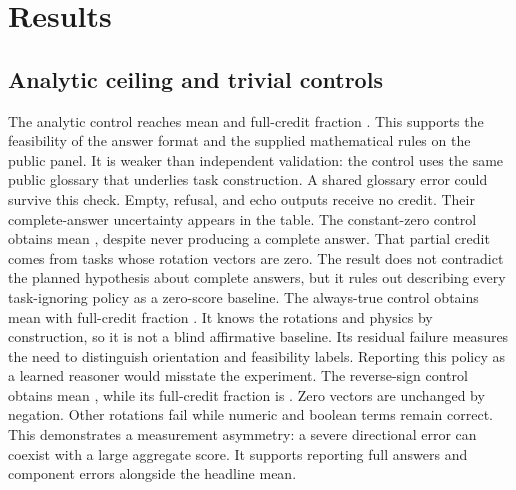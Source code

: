 \documentclass{article}
\begin{document}
\section{Results}
\subsection{Analytic ceiling and trivial controls}
\begin{table}[ht]\centering\small\caption{Scripted controls. Brackets are 95\% intervals. Means resample tricks; full-credit intervals use Wilson's task-level model.}\end{table}

The analytic control reaches mean \OracleMean{} and full-credit fraction \OracleFull{}. This supports the feasibility of the answer format and the supplied mathematical rules on the public panel. It is weaker than independent validation: the control uses the same public glossary that underlies task construction. A shared glossary error could survive this check.
Empty, refusal, and echo outputs receive no credit. Their complete-answer uncertainty appears in the table. The constant-zero control obtains mean \ConstantMean{}, despite never producing a complete answer. That partial credit comes from tasks whose rotation vectors are zero. The result does not contradict the planned hypothesis about complete answers, but it rules out describing every task-ignoring policy as a zero-score baseline.
The always-true control obtains mean \AlwaysMean{} with full-credit fraction \AlwaysFull{}. It knows the rotations and physics by construction, so it is not a blind affirmative baseline. Its residual failure measures the need to distinguish orientation and feasibility labels. Reporting this policy as a learned reasoner would misstate the experiment.
The reverse-sign control obtains mean \ReverseMean{}, while its full-credit fraction is \ReverseFull{}. Zero vectors are unchanged by negation. Other rotations fail while numeric and boolean terms remain correct. This demonstrates a measurement asymmetry: a severe directional error can coexist with a large aggregate score. It supports reporting full answers and component errors alongside the headline mean.
\end{document}
